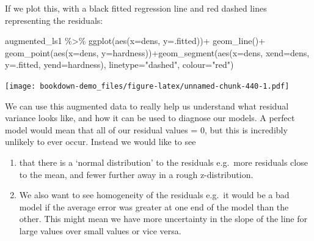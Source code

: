 \documentclass[
]{book}
\newenvironment{Shaded}{\begin{snugshade}}{\end{snugshade}}
\newcommand{\AttributeTok}[1]{\textcolor[rgb]{0.77,0.63,0.00}{#1}}
\newcommand{\FunctionTok}[1]{\textcolor[rgb]{0.00,0.00,0.00}{#1}}
\newcommand{\NormalTok}[1]{#1}
\newcommand{\SpecialCharTok}[1]{\textcolor[rgb]{0.00,0.00,0.00}{#1}}
\newcommand{\StringTok}[1]{\textcolor[rgb]{0.31,0.60,0.02}{#1}}
\begin{document}
If we plot this, with a black fitted regression line and red dashed lines representing the residuals:

\begin{Shaded}
\begin{Highlighting}[]
\NormalTok{augmented\_ls1 }\SpecialCharTok{\%\textgreater{}\%} 
    \FunctionTok{ggplot}\NormalTok{(}\FunctionTok{aes}\NormalTok{(}\AttributeTok{x=}\NormalTok{dens, }\AttributeTok{y=}\NormalTok{.fitted))}\SpecialCharTok{+}
    \FunctionTok{geom\_line}\NormalTok{()}\SpecialCharTok{+} \FunctionTok{geom\_point}\NormalTok{(}\FunctionTok{aes}\NormalTok{(}\AttributeTok{x=}\NormalTok{dens, }\AttributeTok{y=}\NormalTok{hardness))}\SpecialCharTok{+}\FunctionTok{geom\_segment}\NormalTok{(}\FunctionTok{aes}\NormalTok{(}\AttributeTok{x=}\NormalTok{dens, }\AttributeTok{xend=}\NormalTok{dens, }\AttributeTok{y=}\NormalTok{.fitted, }\AttributeTok{yend=}\NormalTok{hardness), }\AttributeTok{linetype=}\StringTok{"dashed"}\NormalTok{, }\AttributeTok{colour=}\StringTok{"red"}\NormalTok{)}
\end{Highlighting}
\end{Shaded}

\texttt{[image: bookdown-demo\_files/figure-latex/unnamed-chunk-440-1.pdf]}

We can use this augmented data to really help us understand what residual variance looks like, and how it can be used to diagnose our models. A perfect model would mean that all of our residual values = 0, but this is incredibly unlikely to ever occur. Instead we would like to see

\begin{enumerate}
\def\labelenumi{\arabic{enumi})}
\item
  that there is a `normal distribution' to the residuals e.g.~more residuals close to the mean, and fewer further away in a rough z-distribution.
\item
  We also want to see homogeneity of the residuals e.g.~it would be a bad model if the average error was greater at one end of the model than the other. This might mean we have more uncertainty in the slope of the line for large values over small values or vice versa.
\end{enumerate}
\end{document}
